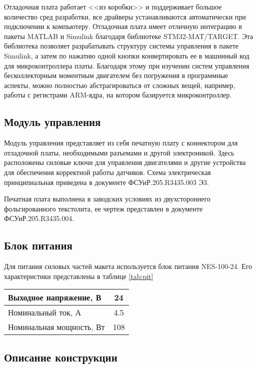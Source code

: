 
Отладочная плата работает <<из коробки>> и поддерживает большое количество сред разработки,
все драйверы устанавливаются автоматически при подключении к компьютеру. Отладочная
плата имеет отличную интеграцию в пакеты MATLAB и Simulink благодаря библиотеке STM32-MAT/TARGET.
Эта библиотека позволяет разрабатывать структуру системы управления в пакете Simulink, а затем 
по нажатию одной кнопки конвертировать ее в машинный код для микроконтроллера платы.
Благодаря этому при изучении систем управления бесколлекторным моментным двигателем без
погружения в программные аспекты,
можно полностью абстрагироваться от сложных вещей, например, работы с регистрами ARM-ядра,
на котором базируется микроконтроллер.

\subsection{Модуль управления}

Модуль управления представляет из себя печатную плату с коннектором для отладочной платы, 
необходимыми разъемами и другой электроникой. Здесь расположены силовые ключи для управления 
двигателями и другие устройства для обеспечения корректной работы датчиков.
Схема электрическая принципиальная приведена в документе ФСУиР.205.R3435.003 Э3.

Печатная плата выполнена в заводских условиях из двухстороннего фольгированного текстолита, 
ее чертеж представлен в документе ФСУиР.205.R3435.004.

\subsection{Блок питания}

Для питания силовых частей макета используется блок питания NES-100-24. Его характеристики 
представлены в таблице \ref{tab:pit}

\begin{tabularx}{\textwidth}{|X|c|}
  \caption{Характеристики блока питания}\label{tab:pit}\\
  \hline
    Выходное напряжение, В & 24 \\
  \hline
    Номинальный ток, А & 4.5 \\
  \hline
    Номинальная мощность, Вт & 108 \\
  \hline
\end{tabularx}

\subsection{Описание конструкции}

